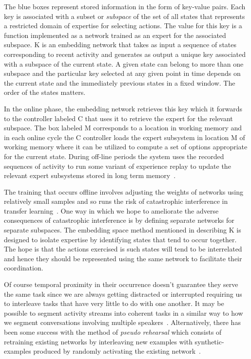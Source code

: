 \documentclass[letterpaper,11pt]{article}
\def\colorred#1{{\color{red}#1}}
\def\colorblu#1{{\color{blue}#1}}
\begin{document}
The blue boxes represent stored information in the form of key-value pairs. Each key is associated with a subset or {\it{subspace}} of the set of all states that represents a restricted domain of expertise for selecting actions. The value for this key is a function implemented as a network trained as an expert for the associated subspace. \colorblu{K} is an embedding network that takes as input a sequence of states corresponding to recent activity and generates as output a unique key associated with a subspace of the current state. A given state can belong to more than one subspace and the particular key selected at any given point in time depends on the current state and the immediately previous states in a fixed window. The order of the states matters. 

In the online phase, the embedding network retrieves this key which it forwards to the controller labeled \colorred{C} that uses it to retrieve the expert for the relevant subspace. The box labeled \colorblu{M} corresponds to a location in working memory and in each online cycle the \colorred{C} controller loads the expert subsystem in location \colorblu{M} of working memory where it can be utilized to compute a set of options appropriate for the current state. During off-line periods the system uses the recorded sequences of activity to run some variant of experience replay to update the relevant expert subsystems stored in long term memory~\cite{AndrychowiczetalCoRR-17,SchauletalCoRR-15,LinML-92}.

The training that occurs offline involves adjusting the weights of networks using relatively small samples and so runs the risk of catastrophic interference in transfer learning~\cite{McClellandetalPR-95}. One way in which we hope to ameliorate the adverse consequences of catastrophic interference is by defining separate networks for separate subspaces. The embedding space method mentioned in describing \colorblu{K} is designed to isolate expertise by identifying states that tend to occur together. The hope is that the actions exercised is such states will tend to be interrelated and hence they should be represented using the same network to facilitate their coordination. 

Of course temporal proximity in their occurrence doesn't guarantee they serve the same task since we are always getting distracted or interrupted requiring us to interleave tasks that have very little to do with one another. It may be possible to segment activity streams into coherent tasks in a similar way to how we segment conversations involving multiple speakers~\cite{SeldinetalICSS-01,SeldinetalICML-01}. Alternatively, there has been some success with the method of {\it{pseudo rehearsal}} which consists of retraining existing networks by interleaving new examples with synthetic-examples produced by randomly activating the existing network~\cite{ZhiyuanandBingLML-18,KirkpatricketalCoRR-16,AnsetalCSS-02,FrenchTiCS-99,FrenchCONNECTION-SCIENCE-97,RobinsCONNECTION-SCIENCE-95}.
\end{document}
